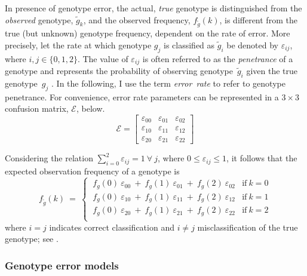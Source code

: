 In presence of genotype error, the actual, \emph{true} genotype is distinguished from the \emph{observed} genotype, $\tilde{g}_k$, and the observed frequency, ${f_{\tilde{g}}(k)}$, is different from the true (but unknown) genotype frequency, dependent on the rate of error.
More precisely, let the rate at which genotype $g_j$ is classified as $\tilde{g}_i$ be denoted by $\varepsilon_{ij}$, where ${i,j \in \lbrace 0, 1, 2 \rbrace}$.
The value of $\varepsilon_{ij}$ is often referred to as the \emph{penetrance} of a genotype and represents the probability of observing genotype~$\tilde{g}_i$ given the true genotype~$g_j$ \citep{ott1999analysis,Gordon:2002cz}.
In the following, I use the term \emph{error~rate} to refer to genotype penetrance.
For convenience, error rate parameters can be represented in a ${3 \times 3}$ confusion matrix, $\mathcal{E}$, below.
\begin{equation}\label{eq:errormatrix}%
\mathcal{E} =
\begin{bmatrix}
	\varepsilon_{00}  &  \varepsilon_{01}  &  \varepsilon_{02}  \\
	\varepsilon_{10}  &  \varepsilon_{11}  &  \varepsilon_{12}  \\
	\varepsilon_{20}  &  \varepsilon_{21}  &  \varepsilon_{22}
\end{bmatrix}
\end{equation}

Considering the relation ${\sum_{i=0}^{2} \varepsilon_{ij} = 1 ~ \forall ~ j}$, where ${0 \leq \varepsilon_{ij} \leq 1}$, it follows that the expected observation frequency of a genotype is
\begin{equation}\label{eq:errfrqprob}%
f_{\tilde{g}}(k) ~=~
\begin{cases}
~	f_g(0)~\varepsilon_{00} ~+~
	f_g(1)~\varepsilon_{01} ~+~
	f_g(2)~\varepsilon_{02}  &  \text{if} ~ k = 0 \\
~	f_g(0)~\varepsilon_{10} ~+~
	f_g(1)~\varepsilon_{11} ~+~
	f_g(2)~\varepsilon_{12}  &  \text{if} ~ k = 1 \\
~	f_g(0)~\varepsilon_{20} ~+~
	f_g(1)~\varepsilon_{21} ~+~
	f_g(2)~\varepsilon_{22}  &  \text{if} ~ k = 2 \\
\end{cases}
\end{equation}
where $i=j$ indicates correct classification and $i \neq j$ misclassification of the true genotype; see \citet{Moskvina:2006fz}.


%
\subsubsection{Genotype error models}
%

